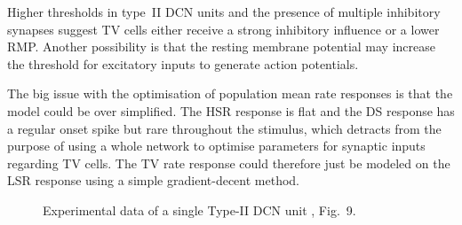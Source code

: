 \medskip{}

Higher thresholds in type~II DCN units \citep{SpirouDavisEtAl:1999} and the
presence of multiple inhibitory synapses \citep{Alibardi:2006} suggest TV cells
either receive a strong inhibitory influence or a lower RMP\@. Another possibility
is that the resting membrane potential may increase the threshold for excitatory
inputs to generate action potentials.


\medskip{}

The big issue with the optimisation of population mean rate responses is that
the model could be over simplified.  The HSR response is flat and the DS
response has a regular onset spike but rare throughout the stimulus, which
detracts from the purpose of using a whole network to optimise parameters for
synaptic inputs regarding TV cells.  The TV rate response could therefore just
be modeled on the LSR response using a simple gradient-decent
method. 
 

\begin{figure}[htb]
  \centering
  \caption{Experimental data of a single Type-II DCN unit
    \citep{ReissYoung:2005}, Fig.~9.}
  \label{fig:TVReissFig9}
\end{figure}


